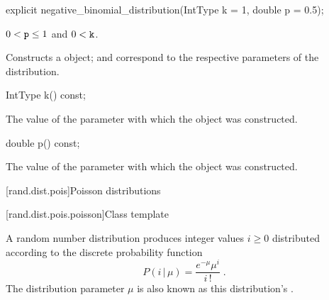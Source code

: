 %
\begin{itemdecl}
explicit negative_binomial_distribution(IntType k = 1, double p = 0.5);
\end{itemdecl}

\begin{itemdescr}
\pnum\requires
 $0 < \texttt{p} \leq 1$
 and $0 < \texttt{k} $.

\pnum\effects Constructs a  object;
  and 
 correspond to the respective parameters of the distribution.
\end{itemdescr}

%
\begin{itemdecl}
IntType k() const;
\end{itemdecl}

\begin{itemdescr}
\pnum\returns The value of the  parameter
 with which the object was constructed.
\end{itemdescr}

%
\begin{itemdecl}
double p() const;
\end{itemdecl}

\begin{itemdescr}
\pnum\returns The value of the  parameter
 with which the object was constructed.
\end{itemdescr}%
%
%



[rand.dist.pois]{Poisson distributions}%
%
%


[rand.dist.pois.poisson]{Class template }%
%
%

\pnum
A  random number distribution
produces integer values $ i \geq 0 $
distributed according to
the discrete probability function
%
%
\[%
 P(i\,|\,\mu)
      = \frac{ e^{-\mu} \mu^{i} }
             { i\,! }
\; \mbox{.}
\]
The distribution parameter $\mu$
is also known as this distribution's %
%
%
.

